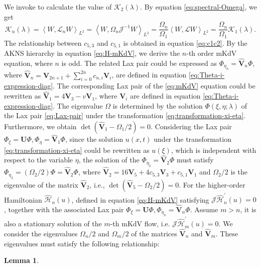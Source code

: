 \documentclass[11pt,reqno]{amsart}
\newtheorem{lemma}{Lemma}
\numberwithin{equation}{section}
\begin{document}
\begin{proof-kerin}
We invoke to calculate the value of $\mathcal{K}_2(\lambda)$. By equation \eqref{eq:spectral-Omega}, we get
\begin{equation} \nonumber
	\mathcal{K}_n(\lambda)
	=\left\langle W,\mathcal{L}_nW \right\rangle_{L^2}
	=\left\langle W,\Omega_n \mathcal{J}^{-1} W \right\rangle_{L^2}
	=\frac{\Omega_n}{\Omega_1}\left\langle W,\mathcal{L} W \right\rangle_{L^2}
	=\frac{\Omega_n}{\Omega_1} \mathcal{K}_1(\lambda).
\end{equation}
The relationship between $c_{5,3}$ and $c_{5,1}$ is obtained in equation \eqref{eq:c1c2}. 
By the AKNS hierarchy in equation \eqref{eq:H-mKdV}, we derive the $n$-th order mKdV equation, where $n$ is odd.
The related Lax pair could be expressed as $\Phi_{\eta_{n}}=\mathbf{\hat{V}}_{n}\Phi$, where $\hat{\mathbf{V}}_n=\mathbf{V}_{2n+1}+\sum_{i=0}^{2n} c_{n,i} \mathbf{V}_i$, are defined in equation \eqref{eq:Theta-i-expression-diag}.
The corresponding Lax pair of the \ref{eq:mKdV} equation could be rewritten as $\hat{\mathbf{V}}_1=4\mathbf{V}_3-v\mathbf{V}_1$, where $\mathbf{V}_i$ are defined in equation \eqref{eq:Theta-i-expression-diag}.
The eigenvalue $\Omega$ is determined by the solution $\Phi(\xi,\eta;\lambda)$ of the Lax pair \eqref{eq:Lax-pair} under the transformation \eqref{eq:transformation-xi-eta}. 
Furthermore, we obtain $\det(\hat{\mathbf{V}}_1-\Omega_1/2)=0$.
Considering the Lax pair $\Phi_{\xi}=\mathbf{U}\Phi,\Phi_{\eta}=\hat{\mathbf{V}}_1\Phi$,
	since the solution $u(x,t)$ under the transformation \eqref{eq:transformation-xi-eta} could be rewritten as $u(\xi)$, which is independent with respect to the variable $\eta$, the solution of the $\Phi_{\eta_2}=\hat{\mathbf{V}}_2\Phi$ must satisfy $\Phi_{\eta_2}=(\Omega_2/2)\Phi=\hat{\mathbf{V}}_2\Phi$, where $\hat{\mathbf{V}}_2=16\mathbf{V}_5+4c_{5,3}\mathbf{V}_3+c_{5,1}\mathbf{V}_1$ and $\Omega_2/2$ is the eigenvalue of the matrix $\hat{\mathbf{V}}_2$,
	i.e.,
	$\det(\hat{\mathbf{V}}_5-\Omega_2/2)=0$.
	For the higher-order Hamiltonian $\hat{\mathcal{H}}_n(u)$, defined in equation \eqref{eq:H-mKdV} satisfying $\mathcal{J}\hat{\mathcal{H}}_n^{\prime}(u)=0$, together with the associated Lax pair $\Phi_{\xi}=\mathbf{U}\Phi,\Phi_{\eta_n}=\hat{\mathbf{V}}_n\Phi$. Assume $m>n$, it is also a stationary solution of the $m$-th mKdV flow, i.e. $\mathcal{J}\hat{\mathcal{H}}_m^{\prime}(u)=0$. 
	We consider the eigenvalues $\Omega_n/2$ and $\Omega_m/2$ of the matrices $\hat{\mathbf{V}}_n$ and $\hat{\mathbf{V}}_m$.
	These eigenvalues must satisfy the following relationship:
	\begin{lemma}\label{lemma:Omega-n-m}

\end{lemma}
\end{proof-kerin}
\end{document}
